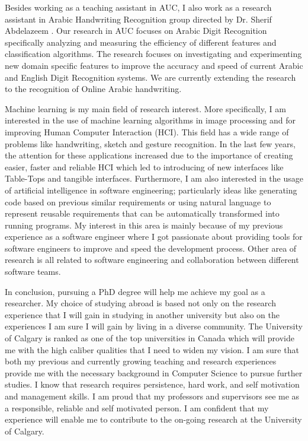 \documentclass[10pt]{article}%
\begin{document}
	Besides working as a teaching assistant in AUC, I also work as a research assistant in Arabic Handwriting Recognition group directed by Dr. Sherif Abdelazeem . Our research in AUC focuses on Arabic Digit Recognition specifically analyzing and measuring the efficiency of different features and classification algorithms.  The research focuses on investigating and experimenting new domain specific features to improve the accuracy and speed of current Arabic and English Digit Recognition systems. We are currently extending the research to the recognition of Online Arabic handwriting.



	Machine learning is my main field of research interest. More specifically, I am interested in the use of machine learning algorithms in image processing and for improving Human Computer Interaction (HCI). This field has a wide range of problems like handwriting, sketch and gesture recognition. In the last few years, the attention for these applications increased due to the importance of creating easier, faster and reliable HCI which led to introducing of new interfaces like Table-Tops and tangible interfaces. Furthermore, I am also interested in the usage of artificial intelligence in software engineering; particularly ideas like generating code based on previous similar requirements or using natural language to represent reusable requirements that can be automatically transformed into running programs. My interest in this area is mainly because of my previous experience as a software engineer where I got passionate about providing tools for software engineers to improve and speed the development process. Other area of research is all related to software engineering and collaboration between different software teams.

 	In conclusion, pursuing a PhD degree will help me achieve my goal as a researcher. My choice of studying abroad is based not only on the research experience that I will gain in  studying in another university but also on the experiences I am sure I will gain by living in a diverse community. The University of  Calgary is ranked as one of the top universities in Canada which will provide me with the high caliber qualities that I need to widen my vision. I am sure that both my previous and currently growing teaching and research experiences provide me with the necessary background in Computer Science to pursue further studies. I know that research requires persistence, hard work, and self motivation and management skills. I am proud that my professors and supervisors see me as a responsible, reliable and self motivated person. I am confident that my experience will enable me to contribute to the on-going research at the University of Calgary.
\end{document}
